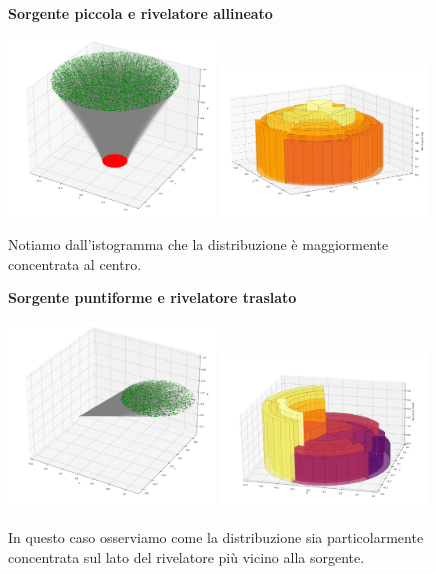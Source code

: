         \begin{figure}[ht]
            \textbf{Sorgente piccola e rivelatore allineato}
            
            \centering
            \includegraphics[width=0.49\textwidth]{images/accettanza/example1.1.png}
            \includegraphics[width=0.49\textwidth]{images/accettanza/example1.2.png}
            \caption{Notiamo dall'istogramma che la distribuzione è maggiormente concentrata al centro.}
        \end{figure}

        \begin{figure}[ht]
            \textbf{Sorgente puntiforme e rivelatore traslato}
            
            \centering
            \includegraphics[width=0.49\textwidth]{images/accettanza/example2.1.png}
            \includegraphics[width=0.49\textwidth]{images/accettanza/example2.2.png}
            \caption{In questo caso osserviamo come la distribuzione sia particolarmente concentrata sul lato del rivelatore più vicino alla sorgente.}
        \end{figure}
        
